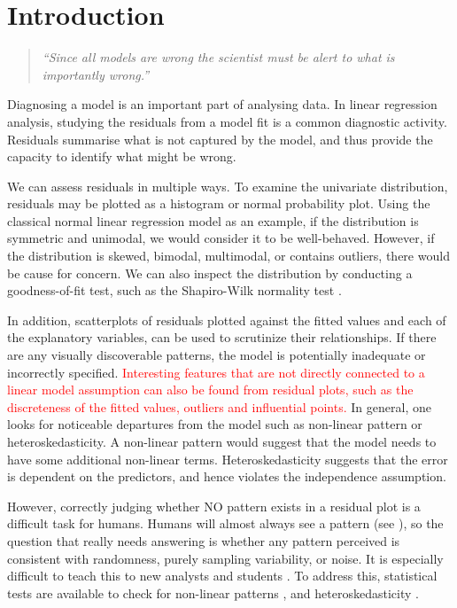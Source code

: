 \documentclass[]{interact}
\theoremstyle{plain}%
\theoremstyle{definition}
\theoremstyle{remark}
\begin{document}
\hypertarget{introduction}{%
\section{Introduction}\label{introduction}}

\begin{quote}
\emph{``Since all models are wrong the scientist must be alert to what
is importantly wrong.''} \citep{box1976science}
\end{quote}

Diagnosing a model is an important part of analysing data. In linear
regression analysis, studying the residuals from a model fit is a common
diagnostic activity. Residuals summarise what is not captured by the
model, and thus provide the capacity to identify what might be wrong.

We can assess residuals in multiple ways. To examine the univariate
distribution, residuals may be plotted as a histogram or normal
probability plot. Using the classical normal linear regression model as
an example, if the distribution is symmetric and unimodal, we would
consider it to be well-behaved. However, if the distribution is skewed,
bimodal, multimodal, or contains outliers, there would be cause for
concern. We can also inspect the distribution by conducting a
goodness-of-fit test, such as the Shapiro-Wilk normality test
\citep{shapiro1965analysis}.

In addition, scatterplots of residuals plotted against the fitted values
and each of the explanatory variables, can be used to scrutinize their
relationships. If there are any visually discoverable patterns, the
model is potentially inadequate or incorrectly specified.
\textcolor{red}{Interesting features that are not directly connected to a linear model assumption can also be found from residual plots, such as the discreteness of the fitted values, outliers and influential points.}
In general, one looks for noticeable departures from the model such as
non-linear pattern or heteroskedasticity. A non-linear pattern would
suggest that the model needs to have some additional non-linear terms.
Heteroskedasticity suggests that the error is dependent on the
predictors, and hence violates the independence assumption.

However, correctly judging whether NO pattern exists in a residual plot
is a difficult task for humans. Humans will almost always see a pattern
(see \citet{kahneman2011thinking}), so the question that really needs
answering is whether any pattern perceived is consistent with
randomness, purely sampling variability, or noise. It is especially
difficult to teach this to new analysts and students
\citep{loy2021bringing}. To address this, statistical tests are
available to check for non-linear patterns
\citep[e.g.][]{ramsey1969tests}, and heteroskedasticity
\citep[e.g.][]{breusch1979simple}.
\end{document}
